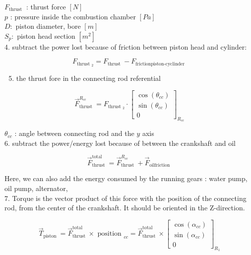 \documentclass[10pt]{article}
\begin{document}
$F_{\text {thrust }}$ : thrust force $[N]$\\
$p$ : pressure inside the combustion chamber $[P a]$\\
$D:$ piston diameter, bore $[m]$\\
$S_{p}:$ piston head section $\left[m^{2}\right]$\\
4. subtract the power lost because of friction between piston head and cylinder:


\begin{equation*}
F_{\text {thrust }_{2}}=F_{\text {thrust }}-F_{\text {frictionpiston-cyclinder }} \tag{4}
\end{equation*}


\begin{enumerate}
  \setcounter{enumi}{4}
  \item the thrust fore in the connecting rod referential
\end{enumerate}

\[
\vec{F}_{\text {thrust }}^{R_{c c}}=F_{\text {thrust }_{2}} \cdot\left[\begin{array}{c}
\cos \left(\theta_{c c}\right)  \tag{5}\\
\sin \left(\theta_{c c}\right) \\
0
\end{array}\right]_{R_{c c}}
\]

$\theta_{c c}$ : angle between connecting rod and the $y$ axis\\
6. subtract the power/energy lost because of between the crankshaft and oil


\begin{equation*}
\vec{F}_{\text {thrust }}^{\text {total }}=\vec{F}_{\text {thrust }}^{R_{c c}}+\vec{F}_{\text {oilfriction }} \tag{6}
\end{equation*}


Here, we can also add the energy consumed by the running gears : water pump, oil pump, alternator,\\
7. Torque is the vector product of this force with the position of the connecting rod, from the center of the crankshaft. It should be oriented in the Z-direction.

\[
\vec{T}_{\text {piston }}=\vec{F}_{\text {thrust }}^{\text {total }} \times \text { position }_{c c}=\vec{F}_{\text {thrust }}^{\text {total }} \times\left[\begin{array}{c}
\cos \left(\alpha_{c c}\right)  \tag{7}\\
\sin \left(\alpha_{c c}\right) \\
0
\end{array}\right]_{R_{1}}
\]
\end{document}

